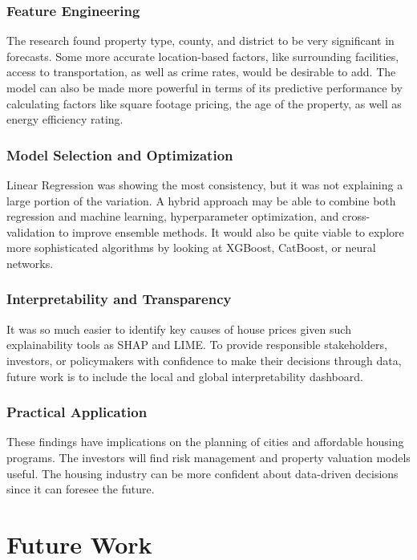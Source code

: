 \documentclass[12pt, a4paper, oneside]{book}
\begin{document}
\subsection*{Feature Engineering}

The research found property type, county, and district to be very significant in forecasts. Some more accurate location-based factors, like surrounding facilities, access to transportation, as well as crime rates, would be desirable to add. The model can also be made more powerful in terms of its predictive performance by calculating factors like square footage pricing, the age of the property, as well as energy efficiency rating.

\subsection*{Model Selection and Optimization}

Linear Regression was showing the most consistency, but it was not explaining a large portion of the variation. A hybrid approach may be able to combine both regression and machine learning, hyperparameter optimization, and cross-validation to improve ensemble methods. It would also be quite viable to explore more sophisticated algorithms by looking at XGBoost, CatBoost, or neural networks.

\subsection*{Interpretability and Transparency}

It was so much easier to identify key causes of house prices given such explainability tools as SHAP and LIME. To provide responsible stakeholders, investors, or policymakers with confidence to make their decisions through data, future work is to include the local and global interpretability dashboard.

\subsection*{Practical Application}
These findings have implications on the planning of cities and affordable housing programs. The investors will find risk management and property valuation models useful. The housing industry can be more confident about data-driven decisions since it can foresee the future.

\chapter{Future Work}\label{ch:6}
\end{document}

